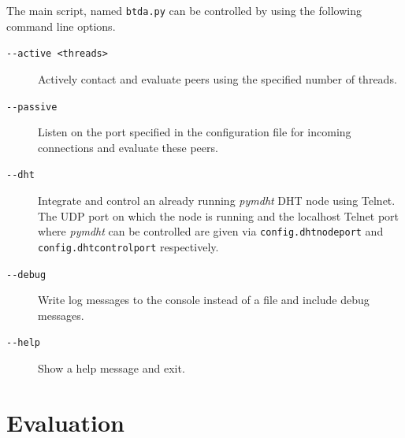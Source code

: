 \documentclass[10pt, a4paper, twoside]{scrartcl}
\renewcommand{\_}{\origunderscore\allowbreak}
\newcommand{\config}[1]{\texttt{config.\allowbreak #1}}
\begin{document}
The main script, named \texttt{btda.py} can be controlled by using the following command line options.

\begin{description}
  \item[\texttt{-{}-active <threads>}] Actively contact and evaluate peers using the specified number of threads.
  \item[\texttt{-{}-passive}] Listen on the port specified in the configuration file for incoming connections and evaluate these peers.
  \item[\texttt{-{}-dht}] Integrate and control an already running \emph{pymdht} \cite{pymdht} DHT node using Telnet. The UDP port on which the node is running and the localhost Telnet port where \emph{pymdht} can be controlled are given via \config{dht\_node\_port} and \config{dht\_control\_port} respectively.
  \item[\texttt{-{}-debug}] Write log messages to the console instead of a file and include debug messages.
  \item[\texttt{-{}-help}] Show a help message and exit.
\end{description}
\cleardoublepage

\section{Evaluation}
\end{document}
